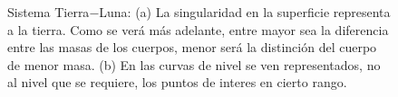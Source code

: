 \begin{figure}[H]
\centering
{}\qquad
{}
\caption{Sistema Tierra$-$Luna: (a) La singularidad en la superficie representa a la tierra. Como se verá más adelante, entre mayor sea la diferencia entre las masas de los cuerpos, menor será la distinción del cuerpo de menor masa. (b) En las curvas de nivel se ven representados, no al nivel que se requiere, los puntos de interes en cierto rango.}
\label{fig: surperficie, cn t-l}
\end{figure}



